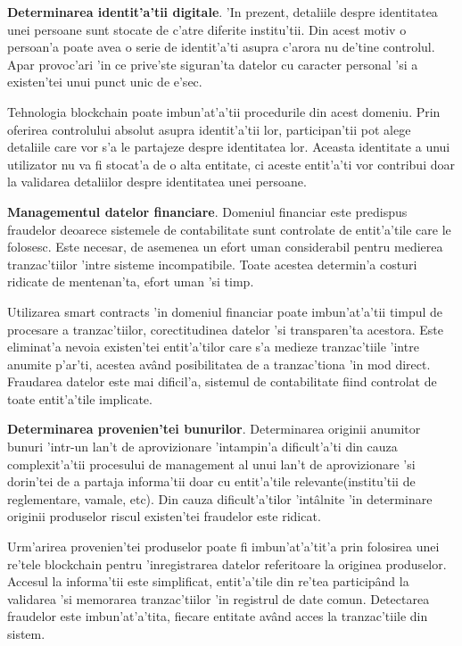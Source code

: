 \documentclass[12pt,a4paper,twoside]{report}
\begin{document}
\textbf{Determinarea identit'a'tii digitale}. 'In prezent, detaliile despre identitatea unei persoane sunt stocate de c'atre diferite institu'tii. Din acest motiv o persoan'a poate avea o serie de identit'a'ti asupra c'arora nu de'tine controlul. Apar provoc'ari 'in ce prive'ste siguran'ta datelor cu caracter personal 'si a existen'tei unui punct unic de e'sec. 

Tehnologia blockchain poate imbun'at'a'tii procedurile din acest domeniu. Prin oferirea controlului absolut asupra identit'a'tii lor, participan'tii pot alege detaliile care vor s'a le partajeze despre identitatea lor. Aceasta identitate a unui utilizator nu va fi stocat'a de o alta entitate, ci aceste entit'a'ti vor contribui doar la validarea detaliilor despre identitatea unei persoane.

\textbf{Managementul datelor financiare}. Domeniul financiar este predispus fraudelor deoarece sistemele de contabilitate sunt controlate de entit'a'tile care le folosesc. Este necesar, de asemenea un efort uman considerabil pentru medierea tranzac'tiilor 'intre sisteme incompatibile. Toate acestea determin'a costuri ridicate de mentenan'ta, efort uman 'si timp.

Utilizarea smart contracts 'in domeniul financiar poate imbun'at'a'tii timpul de procesare a tranzac'tiilor, corectitudinea datelor 'si transparen'ta acestora. Este eliminat'a nevoia existen'tei entit'a'tilor care s'a medieze tranzac'tiile 'intre anumite p'ar'ti, acestea av\^and posibilitatea de a tranzac'tiona 'in mod direct. Fraudarea datelor este mai dificil'a, sistemul de contabilitate fiind controlat de toate entit'a'tile implicate. 

\textbf{Determinarea provenien'tei bunurilor}. Determinarea originii anumitor bunuri 'intr-un lan't de aprovizionare 'intampin'a dificult'a'ti din cauza complexit'a'tii procesului de management al unui lan't de aprovizionare 'si dorin'tei de a partaja informa'tii doar cu entit'a'tile relevante(institu'tii de reglementare, vamale, etc). Din cauza dificult'a'tilor 'int\^alnite 'in determinare originii produselor riscul existen'tei fraudelor este ridicat.

Urm'arirea provenien'tei produselor poate fi imbun'at'a'tit'a prin folosirea unei re'tele blockchain pentru 'inregistrarea datelor referitoare la originea produselor. Accesul la informa'tii este simplificat, entit'a'tile din re'tea particip\^and la validarea 'si memorarea tranzac'tiilor 'in registrul de date comun. Detectarea fraudelor este imbun'at'a'tita, fiecare entitate av\^and acces la tranzac'tiile din sistem. 
\end{document}

